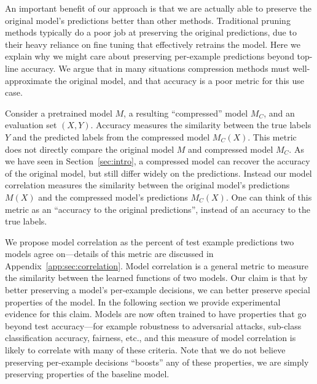 An important benefit of our approach is that we are actually able to preserve the original model's predictions better than other methods.
Traditional pruning methods typically do a poor job at preserving the original predictions, due to their heavy reliance on fine tuning that effectively retrains the model.
Here we explain why we might care about preserving per-example predictions beyond top-line accuracy.
We argue that in many situations compression methods must well-approximate the original model, and that accuracy is a poor metric for this use case.


Consider a pretrained model $M$, a resulting ``compressed'' model $M_C$, and an evaluation set $(X,Y)$.
Accuracy measures the similarity between the true labels $Y$ and the predicted labels from the compressed model $M_C(X)$.
This metric does not directly compare the original model $M$ and compressed model $M_C$.
As we have seen in Section~\ref{sec:intro}, a compressed model can recover the accuracy of the original model, but still differ widely on the predictions.
Instead our model correlation measures the similarity between the original model's predictions $M(X)$ and the compressed model's predictions $M_C(X)$.
One can think of this metric as an ``accuracy to the original predictions'', instead of an accuracy to the true labels.

We propose model correlation as the percent of test example predictions two models agree on---details of this metric are discussed in Appendix~\ref{app:sec:correlation}.
Model correlation is a general metric to measure the similarity between the learned functions 
of two models.
Our claim is that by better preserving a model's per-example decisions, we can better preserve special properties of the model.
In the following section we provide experimental evidence for this claim.
Models are now often trained to have properties that go beyond test accuracy---for example robustness to adversarial attacks, sub-class classification accuracy, fairness, etc., and this measure of model correlation is likely to correlate with many of these criteria.
Note that we do not believe preserving per-example decisions ``boosts'' any of these properties, we are simply preserving properties of the baseline model.







